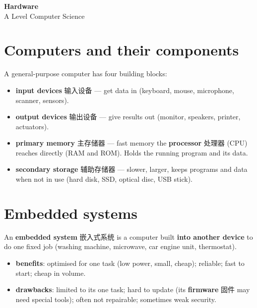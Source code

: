 \documentclass[11pt]{article}
\begin{document}
\begin{center}
  {\LARGE\bfseries Hardware}\\[0.35em]
  {\large A Level Computer Science}
\end{center}
\vspace{0.6em}

\section*{Computers and their components}

A general-purpose computer has four building blocks:

\begin{itemize}
\item \textbf{input devices} 输入设备 — get data in (keyboard, mouse, microphone, scanner, sensors).

\item \textbf{output devices} 输出设备 — give results out (monitor, speakers, printer, actuators).

\item \textbf{primary memory} 主存储器 — fast memory the \textbf{processor} 处理器 (CPU) reaches directly (RAM and ROM). Holds the running program and its data.

\item \textbf{secondary storage} 辅助存储器 — slower, larger, keeps programs and data when not in use (hard disk, SSD, optical disc, USB stick).

\end{itemize}

\section*{Embedded systems}

An \textbf{embedded system} 嵌入式系统 is a computer built \textbf{into another device} to do one fixed job (washing machine, microwave, car engine unit, thermostat).

\begin{itemize}
\item \textbf{benefits}: optimised for one task (low power, small, cheap); reliable; fast to start; cheap in volume.

\item \textbf{drawbacks}: limited to its one task; hard to update (its \textbf{firmware} 固件 may need special tools); often not repairable; sometimes weak security.

\end{itemize}
\end{document}
